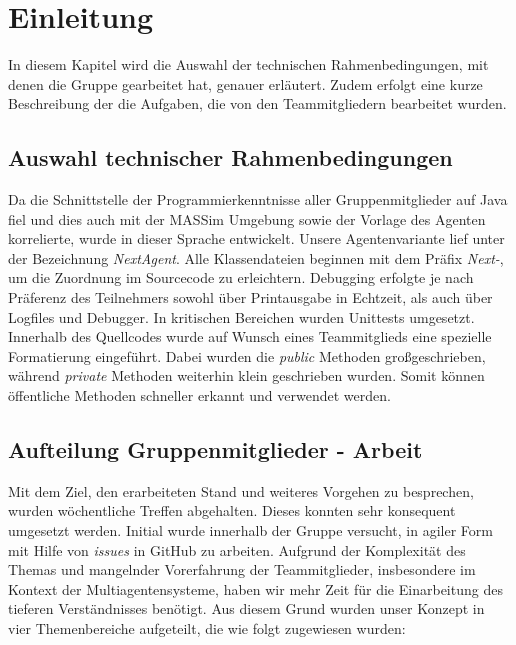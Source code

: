 \section{Einleitung}

In diesem Kapitel wird die Auswahl der technischen Rahmenbedingungen, mit denen die Gruppe gearbeitet hat, genauer erläutert. Zudem erfolgt eine kurze Beschreibung der die Aufgaben, die von den Teammitgliedern bearbeitet wurden.

\subsection{Auswahl technischer Rahmenbedingungen}
Da die Schnittstelle der Programmierkenntnisse aller Gruppenmitglieder auf Java fiel und dies auch mit der MASSim Umgebung sowie der Vorlage des Agenten korrelierte, wurde in dieser Sprache entwickelt. Unsere Agentenvariante lief unter der Bezeichnung \textit{NextAgent}.  Alle Klassendateien beginnen mit dem Präfix \textit{Next-}, um die Zuordnung im Sourcecode zu erleichtern. Debugging erfolgte je nach Präferenz des Teilnehmers sowohl über Printausgabe in Echtzeit, als auch über Logfiles und Debugger. In kritischen Bereichen wurden Unittests umgesetzt. \\

Innerhalb des Quellcodes wurde auf Wunsch eines Teammitglieds eine spezielle Formatierung eingeführt. Dabei wurden die \textit{public} Methoden großgeschrieben, während \textit{private} Methoden weiterhin klein geschrieben wurden. Somit können öffentliche Methoden schneller erkannt und verwendet werden.

\subsection{Aufteilung Gruppenmitglieder - Arbeit}

Mit dem Ziel, den erarbeiteten Stand und weiteres Vorgehen zu besprechen, wurden wöchentliche Treffen abgehalten. Dieses konnten sehr konsequent umgesetzt werden. Initial wurde innerhalb der Gruppe versucht, in agiler Form mit Hilfe von \textit{issues} in GitHub zu arbeiten. Aufgrund der Komplexität des Themas und mangelnder Vorerfahrung der Teammitglieder, insbesondere im Kontext der Multiagentensysteme, haben wir mehr Zeit für die Einarbeitung des tieferen Verständnisses benötigt. 
\newpage
Aus diesem Grund wurden unser Konzept in vier Themenbereiche aufgeteilt, die wie folgt zugewiesen wurden:

